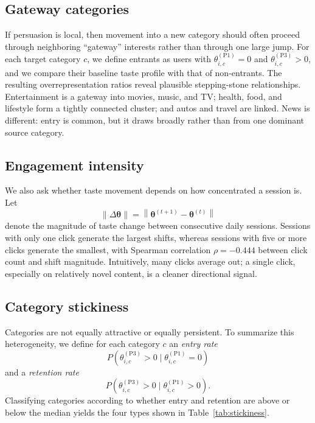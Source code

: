 \documentclass[11pt]{article}
\begin{document}
\subsection{Gateway categories}

If persuasion is local, then movement into a new category should often proceed through neighboring ``gateway'' interests rather than through one large jump. For each target category $c$, we define entrants as users with $\theta_{i,c}^{(\mathrm{P1})}=0$ and $\theta_{i,c}^{(\mathrm{P3})}>0$, and we compare their baseline taste profile with that of non-entrants. The resulting overrepresentation ratios reveal plausible stepping-stone relationships. Entertainment is a gateway into movies, music, and TV; health, food, and lifestyle form a tightly connected cluster; and autos and travel are linked. News is different: entry is common, but it draws broadly rather than from one dominant source category.
\subsection{Engagement intensity}

We also ask whether taste movement depends on how concentrated a session is. Let
\[
\|\Delta\boldsymbol{\theta}\| = \left\|\boldsymbol{\theta}^{(t+1)}-\boldsymbol{\theta}^{(t)}\right\|
\]
denote the magnitude of taste change between consecutive daily sessions. Sessions with only one click generate the largest shifts, whereas sessions with five or more clicks generate the smallest, with Spearman correlation $\rho=-0.444$ between click count and shift magnitude. Intuitively, many clicks average out; a single click, especially on relatively novel content, is a cleaner directional signal.
\subsection{Category stickiness}

Categories are not equally attractive or equally persistent. To summarize this heterogeneity, we define for each category $c$ an \emph{entry rate}
\[
P\!\left(\theta_{i,c}^{(\mathrm{P3})}>0 \mid \theta_{i,c}^{(\mathrm{P1})}=0\right)
\]
and a \emph{retention rate}
\[
P\!\left(\theta_{i,c}^{(\mathrm{P3})}>0 \mid \theta_{i,c}^{(\mathrm{P1})}>0\right).
\]
Classifying categories according to whether entry and retention are above or below the median yields the four types shown in Table~\ref{tab:stickiness}.
\end{document}
